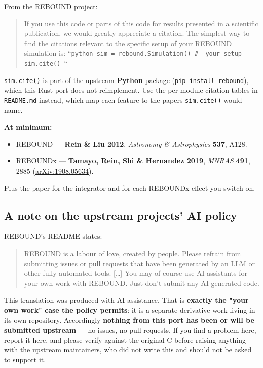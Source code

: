 \documentclass[11pt]{article}
\begin{document}
From the REBOUND project:

\begin{quote}
If you use this code or parts of this code for results presented in a scientific publication, we would greatly appreciate a citation. The simplest way to find the citations relevant to the specific setup of your REBOUND simulation is:  ``\texttt{python sim = rebound.Simulation() \# -your setup- sim.cite() }``
\end{quote}

\texttt{sim.cite()} is part of the upstream \textbf{Python} package (\texttt{pip install rebound}), which this Rust port does not reimplement. Use the per-module citation tables in \texttt{README.md} instead, which map each feature to the papers \texttt{sim.cite()} would name.

\textbf{At minimum:}

\begin{itemize}
\item REBOUND --- \textbf{Rein \& Liu 2012}, \emph{Astronomy \& Astrophysics} \textbf{537}, A128.
\item REBOUNDx --- \textbf{Tamayo, Rein, Shi \& Hernandez 2019}, \emph{MNRAS} \textbf{491}, 2885 (\href{https://arxiv.org/abs/1908.05634}{arXiv:1908.05634}).
\end{itemize}

Plus the paper for the integrator and for each REBOUNDx effect you switch on.

\subsection{A note on the upstream projects' AI policy}

REBOUND's README states:

\begin{quote}
REBOUND is a labour of love, created by people. Please refrain from submitting issues or pull requests that have been generated by an LLM or other fully-automated tools. [\ldots{}] You may of course use AI assistants for your own work with REBOUND. Just don't submit any AI generated code.
\end{quote}

This translation was produced with AI assistance. That is \textbf{exactly the "your own work" case the policy permits}: it is a separate derivative work living in its own repository. Accordingly \textbf{nothing from this port has been or will be submitted upstream} --- no issues, no pull requests. If you find a problem here, report it here, and please verify against the original C before raising anything with the upstream maintainers, who did not write this and should not be asked to support it.
\end{document}
